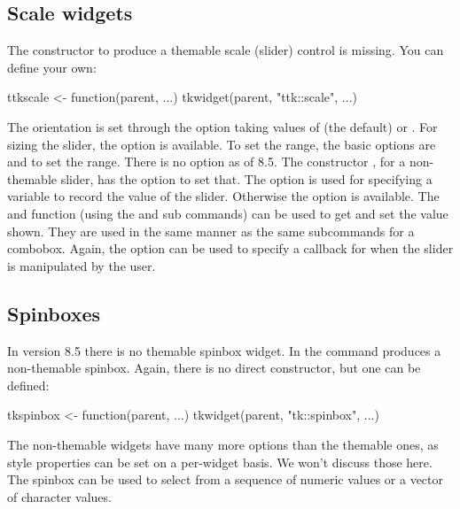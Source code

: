 \subsection{Scale widgets}
\label{sec:tcltk:scale-widgets}

The  constructor to produce a themable scale (slider) control is missing. You can define your own:
\begin{Schunk}
\begin{Sinput}
 ttkscale <- function(parent, ...) tkwidget(parent, "ttk::scale", ...)
\end{Sinput}
\end{Schunk}

The orientation is set through the option 
taking values of  (the default) or
. For sizing the slider, the 
option is available.  To set the range, the basic options are
 and  to set the
range. There is no  option as of \TK\/ 8.5. The constructor
, for a non-themable slider, has the option
 to set that. The
 option is used for specifying a \TCL\/
variable to record the value of the slider. Otherwise the
 option is available.  The  and  function (using the 
 and  sub commands)
can be used to get and set the value shown. They are used in the same
manner as the same subcommands for a combobox. Again, the
 option can be used to specify a callback
for when the slider is manipulated by the user.


\subsection{Spinboxes}
\label{sec:tcltk:spinboxes}

In \TK\/ version 8.5 there is no themable spinbox widget. In \TK\/ the
 command produces a non-themable spinbox. Again, there
is no direct  constructor, but one can be defined:
\begin{Schunk}
\begin{Sinput}
 tkspinbox <- function(parent, ...) tkwidget(parent, "tk::spinbox", ...)
\end{Sinput}
\end{Schunk}

The non-themable widgets have many more options than the themable ones, as style properties can be set on a per-widget basis. We won't discuss those here. The spinbox can be used to select from a sequence of numeric values or a vector of character values.


